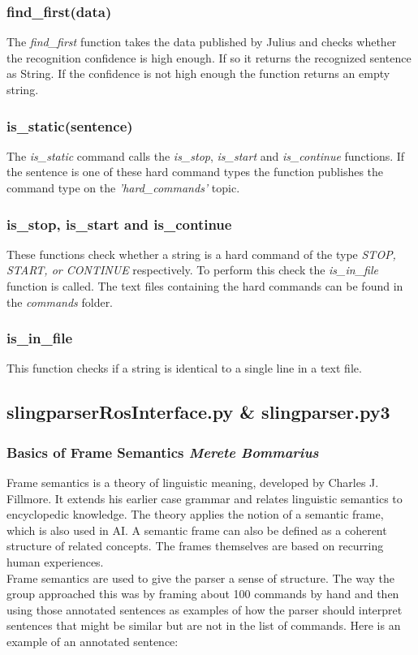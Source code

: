 \documentclass[main.tex]{subfiles}
\begin{document}
        \subsubsection{find\_first(data)}
            The \textit{find\_first} function takes the data published by Julius and checks whether the recognition confidence is high enough. If so it returns the recognized sentence as String. If the confidence is not high enough the function returns an empty string.\\
    
        \subsubsection{is\_static(sentence)}
            The \textit{is\_static} command calls the \textit{is\_stop}, \textit{is\_start} and \textit{is\_continue} functions. If the sentence is one of these hard command types the function publishes the command type on the \textit{'hard\_commands'} topic.
    
        \subsubsection{is\_stop, is\_start and is\_continue}
            These functions check whether a string is a hard command of the type \textit{STOP, START, or CONTINUE} respectively. To perform this check the \textit{is\_in\_file} function is called. The text files containing the hard commands can be found in the \textit{commands} folder.
    
        \subsubsection{is\_in\_file}
            This function checks if a string is identical to a single line in a text file.
    
    \subsection{slingparserRosInterface.py \& slingparser.py3}     	
        \subsubsection{Basics of Frame Semantics \small{\textit{Merete Bommarius}}}        
            Frame semantics is a theory of linguistic meaning, developed by Charles J. Fillmore. It extends his earlier case grammar and relates linguistic semantics to encyclopedic knowledge. The theory applies the notion of a semantic frame, which is also used in AI. A semantic frame can also be defined as a coherent structure of related concepts. The frames themselves are based on recurring human experiences.\\
            Frame semantics are used to give the parser a sense of structure. The way the group approached this was by framing about 100 commands by hand and then using those annotated sentences as examples of how the parser should interpret sentences that might be similar but are not in the list of commands. 
            Here is an example of an annotated sentence: 
    
\end{document}
